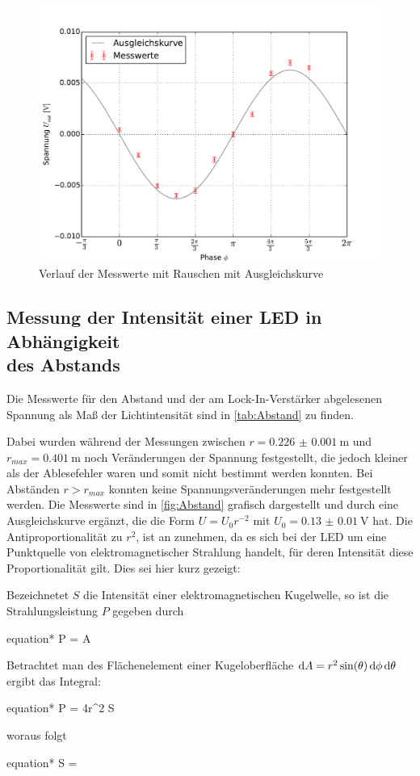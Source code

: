 	\begin{figure}[!h]
		\centering
		\includegraphics[scale=0.75]{Grafiken/MitNoise.pdf}
		\caption{Verlauf der Messwerte mit Rauschen mit Ausgleichskurve}
		\label{fig:mitNoise}
	\end{figure} 
\subsection{Messung der Intensität einer LED in Abhängigkeit  \\des Abstands} \label{sec:Abstand}
	Die Messwerte für den Abstand und der am Lock-In-Verstärker abgelesenen Spannung als Maß der Lichtintensität
	sind in \cref{tab:Abstand} zu finden. 
	
	
	
	Dabei wurden während der Messungen zwischen $r = \SI{0.226(1)}{\meter}$ und $r_{max} = \SI{0.401}{\meter}$ 
	noch Veränderungen der Spannung festgestellt, die jedoch kleiner als der Ablesefehler waren und somit nicht bestimmt
	werden konnten. Bei Abständen $r > r_{max}$ konnten keine Spannungsveränderungen mehr festgestellt werden.
	Die Messwerte sind in \cref{fig:Abstand} grafisch dargestellt und durch eine Ausgleichskurve ergänzt, die 
	die Form $U = U_{0}r^{-2}$ mit $U_{0}= \SI{0.13(1)}{\volt}$ hat. Die Antiproportionalität zu $r^{2}$, ist an
	zunehmen, da es sich bei der LED um eine Punktquelle von elektromagnetischer Strahlung handelt, für deren Intensität
	diese Proportionalität gilt. Dies sei hier kurz gezeigt:
	
	Bezeichnetet $S$ die Intensität einer elektromagnetischen Kugelwelle, so ist die Strahlungsleistung $P$ gegeben durch
	\begin{empheq}{equation*}
		P = \dif A
	\end{empheq}    
	Betrachtet man des Flächenelement einer Kugeloberfläche $\dif A = r^{2} \sin(\theta) \dif\phi \dif\theta$ ergibt das Integral:
	\begin{empheq}{equation*}
	 	P =  4\pi r^{2} \cdot S
	\end{empheq}  
	woraus folgt
	\begin{empheq}{equation*}
	 	S =  \propto {}
	\end{empheq} 
	